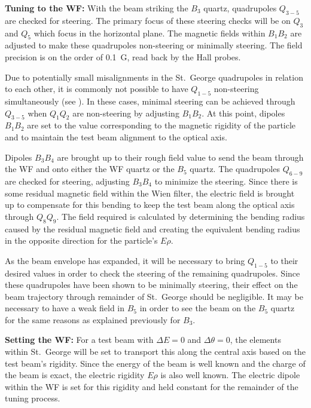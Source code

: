 \textbf{Tuning to the WF:}
With the beam striking the $B_3$ quartz, quadrupoles $Q_{3-5}$ are checked for
steering. The primary focus of these steering
checks will be on $Q_3$ and $Q_5$ which focus in the horizontal plane. The
magnetic fields within $B_1B_2$ are
adjusted to make these quadrupoles non-steering or minimally steering. The
field precision is on the order of 0.1~G, read back by the Hall probes.

Due to potentially small misalignments in the St.\ George quadrupoles in
relation to each other, it is commonly not possible to have $Q_{1-5}$
non-steering simultaneously (see \cite{Meisel2017}). In these cases, minimal
steering can be achieved through $Q_{3-5}$ when $Q_1Q_2$ are non-steering by
adjusting $B_1B_2$. At this point, dipoles $B_1B_2$ are set to the value
corresponding to the magnetic rigidity of the particle and to maintain the
test beam alignment to the optical axis.

Dipoles $B_3B_4$ are brought up to their rough field value to send the beam
through the WF and onto either the WF quartz or the $B_5$ quartz. The
quadrupoles $Q_{6-9}$ are checked for steering, adjusting $B_3B_4$ to minimize
the steering. Since there is some residual magnetic field within the Wien
filter, the electric field is brought up to compensate for this bending to keep
the test beam along the optical axis through $Q_8Q_9$. The field required is
calculated by determining the bending radius caused by the residual magnetic
field and creating the equivalent bending radius in the opposite direction for
the particle's $E\rho$.

As the beam envelope has expanded, it will be necessary to bring $Q_{1-5}$ to
their desired values in order to check the steering of the remaining
quadrupoles. Since these quadrupoles have been shown to be minimally steering,
their effect on the beam trajectory through remainder of St.\ George should be
negligible. It may be necessary to have a weak field in $B_5$ in order to see
the beam on the $B_5$ quartz for the same reasons as explained previously for
$B_3$.

\textbf{Setting the WF:}
For a test beam with $\Delta E = 0$ and $\Delta\theta = 0$, the elements within
St.\ George will be set to transport this along the central axis based on the
test beam's rigidity. Since the energy of the beam is well known and the charge
of the beam is exact, the electric rigidity $E\rho$ is also well known. The
electric dipole within the WF is set for this rigidity and held
constant for the remainder of the tuning process.

